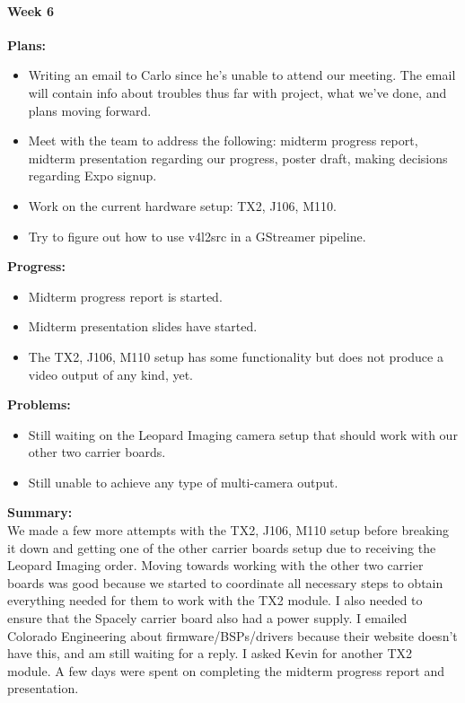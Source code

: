 \paragraph{Week 6}
\begin{adjustwidth}{2.5em}{0pt}
    \vspace{-0.5cm}\textbf{Plans:}
    \vspace{-0.5cm}
    \begin{itemize}
        \item Writing an email to Carlo since he's unable to attend our meeting. The email will contain info about troubles thus far with project, what we've done, and plans moving forward.
        \item Meet with the team to address the following: midterm progress report, midterm presentation regarding our progress, poster draft, making decisions regarding Expo signup. 
		\item Work on the current hardware setup: TX2, J106, M110.
		\item Try to figure out how to use v4l2src in a GStreamer pipeline.
    \end{itemize} 
    \vspace{-0.3cm}\textbf{Progress:}
    \vspace{-0.5cm}
    \begin{itemize}
        \item Midterm progress report is started. 
		\item Midterm presentation slides have started.
		\item The TX2, J106, M110 setup has some functionality but does not produce a video output of any kind, yet.  
    \end{itemize} 
    \vspace{-0.3cm}\textbf{Problems:}
    \vspace{-0.5cm}
    \begin{itemize}
        \item Still waiting on the Leopard Imaging camera setup that should work with our other two carrier boards. 
    	\item Still unable to achieve any type of multi-camera output. 
    \end{itemize}  
    \vspace{-0.3cm}\noindent\textbf{Summary:}\\
    \noindent We made a few more attempts with the TX2, J106, M110 setup before breaking it down and getting one of the other carrier boards setup due to receiving the Leopard Imaging order. Moving towards working with the other two carrier boards was good because we started to coordinate all necessary steps to obtain everything needed for them to work with the TX2 module. I also needed to ensure that the Spacely carrier board also had a power supply. I emailed Colorado Engineering about firmware/BSPs/drivers because their website doesn't have this, and am still waiting for a reply. I asked Kevin for another TX2 module. A few days were spent on completing the midterm progress report and presentation. 
\end{adjustwidth} 

